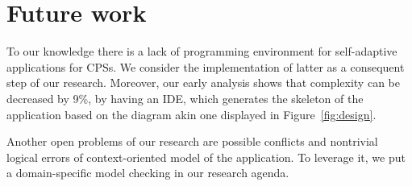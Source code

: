 \section{Future work}

To our knowledge there is a lack of programming environment for self-adaptive
applications for CPSs. We consider the implementation of latter as a consequent
step of our research. Moreover, our early analysis shows that complexity can be
decreased by 9\%, by having an IDE, which generates the skeleton of the
application based on the diagram akin one displayed in Figure~\ref{fig:design}.

Another open problems of our research are possible conflicts and nontrivial
logical errors of context-oriented model of the application. To leverage it, we
put a domain-specific model checking in our research agenda.
